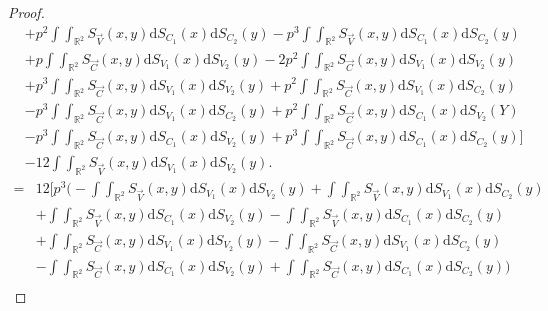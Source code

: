 \begin{proof}
\begin{align*}
        &+p^2\int\int_{\mathbb{R}^2}S_{\vec{V}}\left(x,y\right)\mathrm{d}S_{C_1}\left(x\right)\mathrm{d}S_{C_2}\left(y\right)-p^3\int\int_{\mathbb{R}^2}S_{\vec{V}}\left(x,y\right)\mathrm{d}S_{C_1}\left(x\right)\mathrm{d}S_{C_2}\left(y\right)\\
        &+p\int\int_{\mathbb{R}^2}S_{\vec{C}}\left(x,y\right)\mathrm{d}S_{V_1}\left(x\right)\mathrm{d}S_{V_2}\left(y\right)-2p^2\int\int_{\mathbb{R}^2}S_{\vec{C}}\left(x,y\right)\mathrm{d}S_{V_1}\left(x\right)\mathrm{d}S_{V_2}\left(y\right)\\
        &+p^3\int\int_{\mathbb{R}^2}S_{\vec{C}}\left(x,y\right)\mathrm{d}S_{V_1}\left(x\right)\mathrm{d}S_{V_2}\left(y\right)+p^2\int\int_{\mathbb{R}^2}S_{\vec{C}}\left(x,y\right)\mathrm{d}S_{V_1}\left(x\right)\mathrm{d}S_{C_2}\left(y\right)\\
        &-p^3\int\int_{\mathbb{R}^2}S_{\vec{C}}\left(x,y\right)\mathrm{d}S_{V_1}\left(x\right)\mathrm{d}S_{C_2}\left(y\right)+p^2\int\int_{\mathbb{R}^2}S_{\vec{C}}\left(x,y\right)\mathrm{d}S_{C_1}\left(x\right)\mathrm{d}S_{V_2}\left(Y\right)\\
        &-p^3\int\int_{\mathbb{R}^2}S_{\vec{C}}\left(x,y\right)\mathrm{d}S_{C_1}\left(x\right)\mathrm{d}S_{V_2}\left(y\right)+p^3\int\int_{\mathbb{R}^2}S_{\vec{C}}\left(x,y\right)\mathrm{d}S_{C_1}\left(x\right)\mathrm{d}S_{C_2}\left(y\right)\bigg]\\
        &-12\int\int_{\mathbb{R}^2}S_{\vec{V}}\left(x,y\right)\mathrm{d}S_{V_1}\left(x\right)\mathrm{d}S_{V_2}\left(y\right).
    \end{align*}
    \begin{align*}
        =&12\bigg[p^3\bigg(-\int\int_{\mathbb{R}^2}S_{\vec{V}}\left(x,y\right)\mathrm{d}S_{V_1}\left(x\right)\mathrm{d}S_{V_2}\left(y\right)+\int\int_{\mathbb{R}^2}S_{\vec{V}}\left(x,y\right)\mathrm{d}S_{V_1}\left(x\right)\mathrm{d}S_{C_2}\left(y\right)\\
        &+\int\int_{\mathbb{R}^2}S_{\vec{V}}\left(x,y\right)\mathrm{d}S_{C_1}\left(x\right)\mathrm{d}S_{V_2}\left(y\right)-\int\int_{\mathbb{R}^2}S_{\vec{V}}\left(x,y\right)\mathrm{d}S_{C_1}\left(x\right)\mathrm{d}S_{C_2}\left(y\right)\\
        &+\int\int_{\mathbb{R}^2}S_{\vec{C}}\left(x,y\right)\mathrm{d}S_{V_1}\left(x\right)\mathrm{d}S_{V_2}\left(y\right)-\int\int_{\mathbb{R}^2}S_{\vec{C}}\left(x,y\right)\mathrm{d}S_{V_1}\left(x\right)\mathrm{d}S_{C_2}\left(y\right)\\
        &-\int\int_{\mathbb{R}^2}S_{\vec{C}}\left(x,y\right)\mathrm{d}S_{C_1}\left(x\right)\mathrm{d}S_{V_2}\left(y\right)+\int\int_{\mathbb{R}^2}S_{\vec{C}}\left(x,y\right)\mathrm{d}S_{C_1}\left(x\right)\mathrm{d}S_{C_2}\left(y\right)\bigg)\\

\end{align*}
\end{proof}
